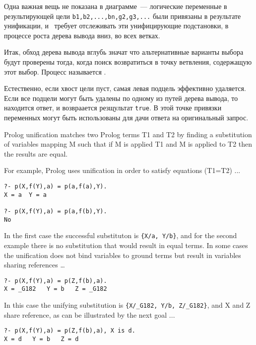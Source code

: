 
Одна важная вещь не показана в диаграмме\ --- логические переменные в
результирующей цели \verb|b1,b2,...,bn,g2,g3,...| были привязаны в результате
унификации, и \prolog\ требует отслеживать эти унифицирующие подстановки, в
процессе роста дерева вывода вниз, во всех ветках.

Итак, обход дерева вывода вглубь значат что альтернативные варианты выбора будут
проверены тогда, когда поиск возвратиться в точку ветвления, содержащую этот
выбор. Процесс называется .

Естественно, если хвост цели пуст, самая левая подцель 
эффективно удаляется. Если все подцели могут быть удалены по одному из путей
дерева вывода, то находится ответ, и возвраается резщультат \verb|true|. В этой
точке привязки переменных могут быть использованы для дачи ответа на
оригинальный запрос.


Prolog unification matches two Prolog terms T1 and T2 by finding a substitution
of variables mapping M such that if M is applied T1 and M is applied to T2 then
the results are equal.

For example, Prolog uses unification in order to satisfy equations (T1=T2) ...

\begin{verbatim}
?- p(X,f(Y),a) = p(a,f(a),Y).
X = a  Y = a

?- p(X,f(Y),a) = p(a,f(b),Y).
No
\end{verbatim}

In the first case the successful substituton is \verb|{X/a, Y/b}|, and for the
second example there is no substitution that would result in equal terms. In
some cases the unification does not bind variables to ground terms but result in
variables sharing references \ldots

\begin{verbatim}
?- p(X,f(Y),a) = p(Z,f(b),a).
X = _G182   Y = b   Z = _G182 
\end{verbatim}

In this case the unifying substitution is \verb|{X/_G182, Y/b, Z/_G182}|, and X
and Z share reference, as can be illustrated by the next goal ...

\begin{verbatim}
?- p(X,f(Y),a) = p(Z,f(b),a), X is d.
X = d   Y = b   Z = d 
\end{verbatim}

